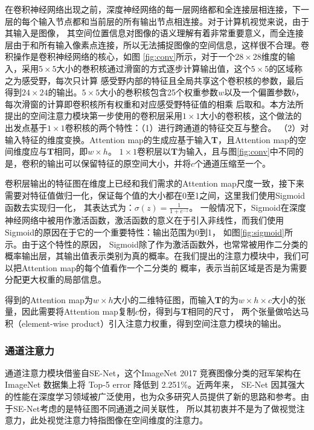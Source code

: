 
在卷积神经网络出现之前，深度神经网络的每一层网络都和全连接层相连接，下一层的每个输入节点都和当前层的所有输出节点相连接。对于计算机视觉来说，由于其输入是图像，
其空间位置信息对图像的语义理解有着非常重要意义，而全连接层由于和所有输入像素点连接，所以无法捕捉图像的空间信息，这样很不合理。卷积操作是卷积神经网络的核心，如图
\ref{fig:conv}所示，对于一个$28 \times 28$维度的输入，采用$5 \times 5$大小的巻积核通过滑窗的方式逐步计算输出值，这个$5 \times 5$的区域称之为感受野，每次只计算
感受野内部的特征且全局共享这个卷积核的参数，最后得到$24 \times 24$的输出。$5 \times 5$大小的巻积核包含25个权重参数$w$以及一个偏置参数$b$，每次滑窗的计算即卷积核所有权重和对应感受野特征值的相乘
后取和。本方法所提出的空间注意力模块第一步使用的卷积层采用$1 \times 1$大小的卷积核，这个做法的出发点基于$1 \times 1$卷积核的两个特性：（1）进行跨通道的特征交互与整合。
（2）对输入特征的维度变换。Attention map的生成应基于输入\textbf{T}，且Attention map的空间维度应与\textbf{T}相同，即$w\times h$。
$1 \times 1$卷积层以\textbf{T}为输入，且与图\ref{fig:conv}中不同的是，卷积的输出可以保留特征的原空间大小，并将$c$个通道压缩至一个。

卷积层输出的特征图在维度上已经和我们需求的Attention map尺度一致，接下来需要对特征值做归一化，保证每个值的大小都在0至1之间，这里我们使用Sigmoid函数去实现归一化，
其表达式为：$\sigma(z)=\frac{1}{1+e^{-z}}$。
一般情况下，Sigmoid在深度神经网络中被用作激活函数，激活函数的意义在于引入非线性，而我们使用Sigmoid的原因在于它的一个重要特性：输出范围为0到1，
如图\ref{fig:sigmoid}所示。由于这个特性的原因，
Sigmoid除了作为激活函数外，也常常被用作二分类的概率输出层，其输出值表示类别为真的概率。在我们提出的注意力模块中，我们可以把Attention map的每个值看作一个二分类的
概率，表示当前区域是否是为需要分配更大权重的局部信息。


得到的Attention map为$w\times h$大小的二维特征图，而输入\textbf{T}的为$w\times h \times c$大小的张量，因此需要将Attention map复制$c$份，得到与\textbf{T}相同的尺寸，
两个张量做哈达马积（element-wise product）引入注意力权重，得到空间注意力模块的输出。

\subsubsection{通道注意力}
通道注意力模块借鉴自SE-Net，这个ImageNet 2017 竞赛图像分类的冠军架构在ImageNet 数据集上将 Top-5 error 降低到 2.251\%。近两年来，
SE-Net 因其强大的性能在深度学习领域被广泛使用，也为众多研究人员提供了新的思路和参考。由于SE-Net考虑的是特征图不同通道之间关联性，
所以其初衷并不是为了做视觉注意力，此处视觉注意力特指图像在空间维度的注意力。


